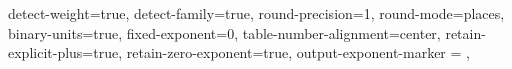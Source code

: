 


\usepackage{siunitx}
\usepackage{booktabs}
\usepackage{calligra}




%

\sisetup
{
detect-weight=true, detect-family=true,
round-precision=1,
round-mode=places,
binary-units=true,
fixed-exponent=0,
table-number-alignment=center,
retain-explicit-plus=true,
retain-zero-exponent=true,
output-exponent-marker = ,
}
\newcommand{\accnum}{\num[scientific-notation=true, round-mode=places, round-precision=0]}


